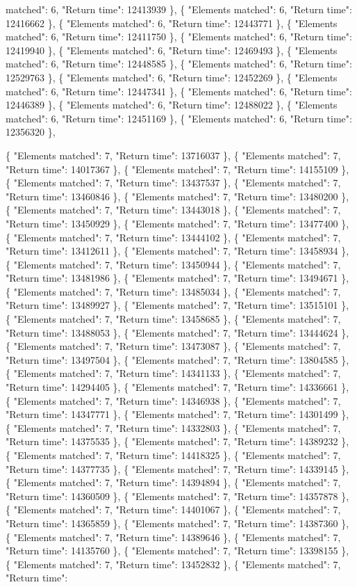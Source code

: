 matched": 6, "Return time": 12413939 \}, \{ "Elements matched": 6, "Return time": 12416662 \}, \{ "Elements matched": 6, "Return time": 12443771 \}, \{ "Elements matched": 6, "Return time": 12411750 \}, \{ "Elements matched": 6, "Return time": 12419940 \}, \{ "Elements matched": 6, "Return time": 12469493 \}, \{ "Elements matched": 6, "Return time": 12448585 \}, \{ "Elements matched": 6, "Return time": 12529763 \}, \{ "Elements matched": 6, "Return time": 12452269 \}, \{ "Elements matched": 6, "Return time": 12447341 \}, \{ "Elements matched": 6, "Return time": 12446389 \}, \{ "Elements matched": 6, "Return time": 12488022 \}, \{ "Elements matched": 6, "Return time": 12451169 \}, \{ "Elements matched": 6, "Return time": 12356320 \},

 \{ "Elements matched": 7, "Return time": 13716037 \}, \{ "Elements matched": 7, "Return time": 14017367 \}, \{ "Elements matched": 7, "Return time": 14155109 \}, \{ "Elements matched": 7, "Return time": 13437537 \}, \{ "Elements matched": 7, "Return time": 13460846 \}, \{ "Elements matched": 7, "Return time": 13480200 \}, \{ "Elements matched": 7, "Return time": 13443018 \}, \{ "Elements matched": 7, "Return time": 13450929 \}, \{ "Elements matched": 7, "Return time": 13477400 \}, \{ "Elements matched": 7, "Return time": 13444102 \}, \{ "Elements matched": 7, "Return time": 13412611 \}, \{ "Elements matched": 7, "Return time": 13458934 \}, \{ "Elements matched": 7, "Return time": 13450944 \}, \{ "Elements matched": 7, "Return time": 13481986 \}, \{ "Elements matched": 7, "Return time": 13494671 \}, \{ "Elements matched": 7, "Return time": 13485034 \}, \{ "Elements matched": 7, "Return time": 13489927 \}, \{ "Elements matched": 7, "Return time": 13515101 \}, \{ "Elements matched": 7, "Return time": 13458685 \}, \{ "Elements matched": 7, "Return time": 13488053 \}, \{ "Elements matched": 7, "Return time": 13444624 \}, \{ "Elements matched": 7, "Return time": 13473087 \}, \{ "Elements matched": 7, "Return time": 13497504 \}, \{ "Elements matched": 7, "Return time": 13804585 \}, \{ "Elements matched": 7, "Return time": 14341133 \}, \{ "Elements matched": 7, "Return time": 14294405 \}, \{ "Elements matched": 7, "Return time": 14336661 \}, \{ "Elements matched": 7, "Return time": 14346938 \}, \{ "Elements matched": 7, "Return time": 14347771 \}, \{ "Elements matched": 7, "Return time": 14301499 \}, \{ "Elements matched": 7, "Return time": 14332803 \}, \{ "Elements matched": 7, "Return time": 14375535 \}, \{ "Elements matched": 7, "Return time": 14389232 \}, \{ "Elements matched": 7, "Return time": 14418325 \}, \{ "Elements matched": 7, "Return time": 14377735 \}, \{ "Elements matched": 7, "Return time": 14339145 \}, \{ "Elements matched": 7, "Return time": 14394894 \}, \{ "Elements matched": 7, "Return time": 14360509 \}, \{ "Elements matched": 7, "Return time": 14357878 \}, \{ "Elements matched": 7, "Return time": 14401067 \}, \{ "Elements matched": 7, "Return time": 14365859 \}, \{ "Elements matched": 7, "Return time": 14387360 \}, \{ "Elements matched": 7, "Return time": 14389646 \}, \{ "Elements matched": 7, "Return time": 14135760 \}, \{ "Elements matched": 7, "Return time": 13398155 \}, \{ "Elements matched": 7, "Return time": 13452832 \}, \{ "Elements matched": 7, "Return time": 